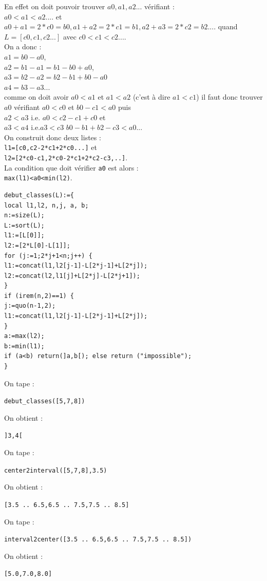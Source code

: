 \documentclass[a4paper,11pt]{book}
\begin{document}
En effet on doit pouvoir trouver $a0,a1,a2...$ v\'erifiant :\\
$a0<a1<a2....$ et\\
$a0+a1=2*c0=b0,a1+a2=2*c1=b1,a2+a3=2*c2=b2....$ quand $L=[c0,c1,c2...]$ avec
$c0<c1<c2...$.\\
On a donc :\\
$a1=b0-a0$,\\
$a2=b1-a1=b1-b0+a0$,\\ 
$a3=b2-a2=b2-b1+b0-a0$\\ 
$a4=b3-a3 ...$\\
comme on doit avoir $a0<a1$ et $a1<a2$ (c'est \`a dire  $a1<c1$) il faut donc 
trouver $a0$ v\'erifiant $a0<c0$ et $b0-c1<a0$ puis\\ 
$a2<a3$ i.e. $a0<c2-c1+c0$ et \\
$a3<a4$ i.e.$a3<c3$ $b0-b1+b2-c3<a0$...\\
On construit donc deux listes :\\
{\tt l1=[c0,c2-2*c1+2*c0...]} et\\
{\tt l2=[2*c0-c1,2*c0-2*c1+2*c2-c3,..]}.\\ 
La condition que doit v\'erifier {\tt a0} est alors :\\
 {\tt max(l1)<a0<min(l2)}.
\begin{verbatim}
debut_classes(L):={
local l1,l2, n,j, a, b;
n:=size(L);
L:=sort(L);
l1:=[L[0]];
l2:=[2*L[0]-L[1]];
for (j:=1;2*j+1<n;j++) {
l1:=concat(l1,l2[j-1]-L[2*j-1]+L[2*j]);
l2:=concat(l2,l1[j]+L[2*j]-L[2*j+1]);
}
if (irem(n,2)==1) {
j:=quo(n-1,2);
l1:=concat(l1,l2[j-1]-L[2*j-1]+L[2*j]);
}
a:=max(l2);
b:=min(l1);
if (a<b) return(]a,b[); else return ("impossible");
}
\end{verbatim}
On tape :
\begin{center}{\tt debut\_classes([5,7,8])}\end{center}
On obtient :
\begin{center}{\tt ]3,4[}\end{center}
On tape :
\begin{center}{\tt center2interval([5,7,8],3.5)}\end{center}
On obtient :
\begin{center}{\tt [3.5 .. 6.5,6.5 .. 7.5,7.5 .. 8.5]}\end{center}
On tape :
\begin{center}{\tt interval2center([3.5 .. 6.5,6.5 .. 7.5,7.5 .. 8.5])}\end{center}
On obtient :
\begin{center}{\tt [5.0,7.0,8.0]}\end{center}
\end{document}
